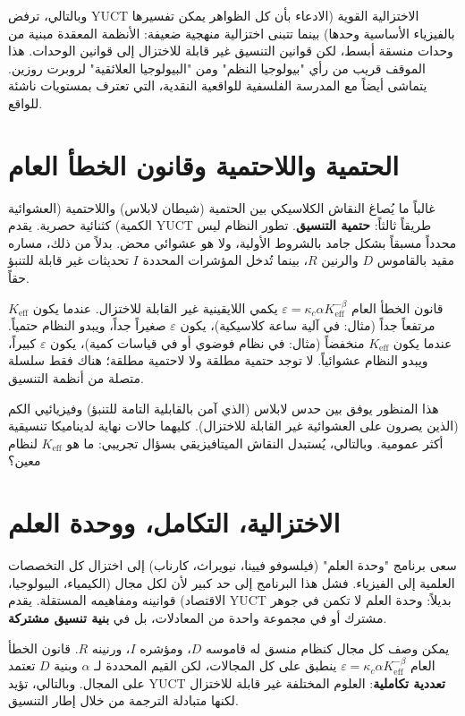 \documentclass[12pt,a4paper]{article}
\begin{document}
	وبالتالي، ترفض YUCT الاختزالية القوية (الادعاء بأن كل الظواهر يمكن تفسيرها بالفيزياء الأساسية وحدها) بينما تتبنى اختزالية منهجية ضعيفة: الأنظمة المعقدة مبنية من وحدات منسقة أبسط، لكن قوانين التنسيق غير قابلة للاختزال إلى قوانين الوحدات. هذا الموقف قريب من رأي "بيولوجيا النظم" ومن "البيولوجيا العلائقية" لروبرت روزين. يتماشى أيضاً مع المدرسة الفلسفية للواقعية النقدية، التي تعترف بمستويات ناشئة للواقع.
	
	\section{الحتمية واللاحتمية وقانون الخطأ العام}
	
	غالباً ما يُصاغ النقاش الكلاسيكي بين الحتمية (شيطان لابلاس) واللاحتمية (العشوائية الكمية) كثنائية حصرية. يقدم YUCT طريقاً ثالثاً: \textbf{حتمية التنسيق}. تطور النظام ليس محدداً مسبقاً بشكل جامد بالشروط الأولية، ولا هو عشوائي محض. بدلاً من ذلك، مساره مقيد بالقاموس \(D\) والرنين \(R\)، بينما تُدخل المؤشرات المحددة \(I\) تحديثات غير قابلة للتنبؤ حقاً.
	
	قانون الخطأ العام \(\varepsilon = \kappa_c \alpha K_{\mathrm{eff}}^{-\beta}\) يكمي اللايقينية غير القابلة للاختزال. عندما يكون \(K_{\mathrm{eff}}\) مرتفعاً جداً (مثال: في آلية ساعة كلاسيكية)، يكون \(\varepsilon\) صغيراً جداً، ويبدو النظام حتمياً. عندما يكون \(K_{\mathrm{eff}}\) منخفضاً (مثال: في نظام فوضوي أو في قياسات كمية)، يكون \(\varepsilon\) كبيراً، ويبدو النظام عشوائياً. لا توجد حتمية مطلقة ولا لاحتمية مطلقة؛ هناك فقط سلسلة متصلة من أنظمة التنسيق.
	
	هذا المنظور يوفق بين حدس لابلاس (الذي آمن بالقابلية التامة للتنبؤ) وفيزيائيي الكم (الذين يصرون على العشوائية غير القابلة للاختزال). كليهما حالات نهاية لديناميكا تنسيقية أكثر عمومية. وبالتالي، يُستبدل النقاش الميتافيزيقي بسؤال تجريبي: ما هو \(K_{\mathrm{eff}}\) لنظام معين؟
	
	\section{الاختزالية، التكامل، ووحدة العلم}
	
	سعى برنامج "وحدة العلم" (فيلسوفو فيينا، نيويراث، كارناب) إلى اختزال كل التخصصات العلمية إلى الفيزياء. فشل هذا البرنامج إلى حد كبير لأن لكل مجال (الكيمياء، البيولوجيا، الاقتصاد) قوانينه ومفاهيمه المستقلة. يقدم YUCT بديلاً: وحدة العلم لا تكمن في جوهر مشترك أو في مجموعة واحدة من المعادلات، بل في \textbf{بنية تنسيق مشتركة}.
	
	يمكن وصف كل مجال كنظام منسق له قاموسه \(D\)، ومؤشره \(I\)، ورنينه \(R\). قانون الخطأ العام \(\varepsilon = \kappa_c \alpha K_{\mathrm{eff}}^{-\beta}\) ينطبق على كل المجالات، لكن القيم المحددة لـ \(\alpha\) وبنية \(D\) تعتمد على المجال. وبالتالي، تؤيد YUCT \textbf{تعددية تكاملية}: العلوم المختلفة غير قابلة للاختزال لكنها متبادلة الترجمة من خلال إطار التنسيق.
	
\end{document}
